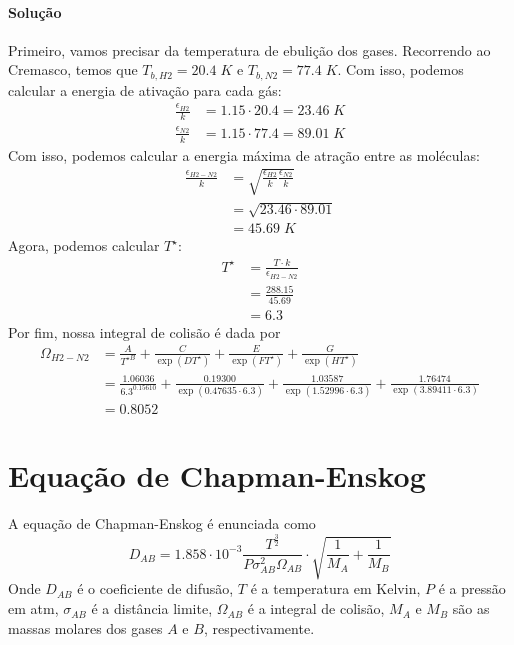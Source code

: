 \paragraph{Solução}
Primeiro, vamos precisar da temperatura de ebulição dos gases. Recorrendo ao Cremasco, temos que 
\(T_{b,H2} = 20.4 \; K\) e \(T_{b,N2} = 77.4 \; K\). Com isso, podemos calcular a energia de
ativação para cada gás:
\begin{align}
    \frac{\epsilon_{H2}}{k} &= 1.15 \cdot 20.4 = 23.46 \; K \\
    \frac{\epsilon_{N2}}{k} &= 1.15 \cdot 77.4 = 89.01 \; K
\end{align}
Com isso, podemos calcular a energia máxima de atração entre as moléculas:
\begin{align}
    \frac{\epsilon_{H2-N2}}{k} &= \sqrt{\frac{\epsilon_{H2}}{k} \frac{\epsilon_{N2}}{k}} \\
    &= \sqrt{23.46 \cdot 89.01} \\
    &= 45.69 \; K
\end{align}
Agora, podemos calcular \(T^{\star}\):
\begin{align}
    T^{\star} &= \frac{T \cdot k}{\epsilon_{H2-N2}} \\
    &= \frac{288.15}{45.69} \\
    &= 6.3
\end{align}
Por fim, nossa integral de colisão é dada por
\begin{align}
    \Omega_{H2-N2} &= \frac{A}{T^{\star B} } + \frac{C}{\exp \left( D T^{\star}  \right) } + \frac{E}{\exp \left( F T^{\star}  \right) } + \frac{G}{\exp \left(H T^{\star}\right) } \\
    &= \frac{1.06036}{6.3^{0.15610} } + \frac{0.19300}{\exp \left( 0.47635 \cdot 6.3  \right) } + \frac{1.03587}{\exp \left( 1.52996 \cdot 6.3  \right) } + \frac{1.76474}{\exp \left(3.89411 \cdot 6.3 \right)} \\
    &= 0.8052
\end{align}

\section{Equação de Chapman-Enskog}
A equação de Chapman-Enskog é enunciada como
\begin{equation}\label{eq:chapman-enskog}
    D_{AB} = 1.858 \cdot 10^{-3} \frac{T^{\frac{3}{2}} }{P \sigma_{AB}^{2} \Omega_{AB}} \cdot \sqrt{\frac{1}{M_A} + \frac{1}{M_{B} }} 
\end{equation}
Onde \(D_{AB}\) é o coeficiente de difusão, \(T\) é a temperatura em Kelvin, \(P\) é a pressão em
atm, \(\sigma_{AB}\) é a distância limite, \(\Omega_{AB}\) é a integral de colisão, \(M_A\) e
\(M_B\) são as massas molares dos gases \(A\) e \(B\), respectivamente.
